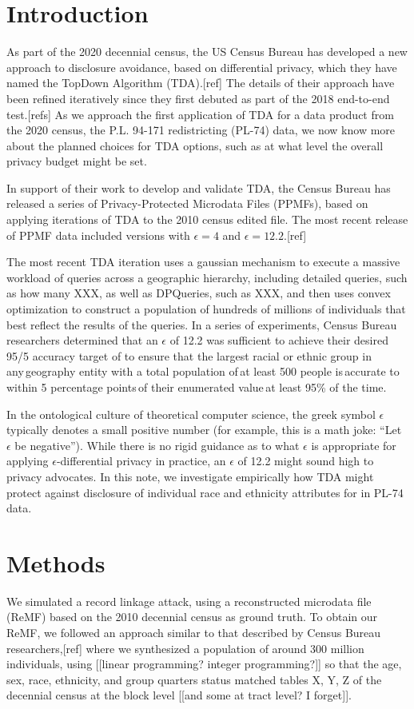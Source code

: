 \documentclass{article}
\begin{document}
\section{Introduction}
\label{introduction}
As part of the 2020 decennial census, the US Census Bureau has developed a new approach to disclosure avoidance, based on differential privacy, which they have named the TopDown Algorithm (TDA).[ref]  The details of their approach have been refined iteratively since they first debuted as part of the 2018 end-to-end test.[refs]  As we approach the first application of TDA for a data product from the 2020 census, the P.L. 94-171 redistricting (PL-74) data, we now know more about the planned choices for TDA options, such as at what level the overall privacy budget might be set.

In support of their work to develop and validate TDA,  the Census Bureau has released a series of Privacy-Protected Microdata Files (PPMFs), based on applying iterations of TDA to the 2010 census edited file.  The most recent release of PPMF data included versions with $\epsilon=4$ and $\epsilon=12.2$.[ref]

The most recent TDA iteration uses a gaussian mechanism to execute a massive workload of queries across a geographic hierarchy, including detailed queries, such as how many XXX, as well as DPQueries, such as XXX, and then uses convex optimization to construct a population of hundreds of millions of individuals that best reflect the results of the queries.  In a series of experiments, Census Bureau researchers determined that an $\epsilon$ of 12.2 was sufficient to achieve their desired 95/5 accuracy target of to ensure that the largest racial or ethnic group in any geography entity with a total population of at least 500 people is accurate to within 5 percentage points of their enumerated value at least 95\% of the time.

In the ontological culture of theoretical computer science, the greek symbol $\epsilon$ typically denotes a small positive number (for example, this is a math joke: ``Let $\epsilon$ be negative'').  While there is no rigid guidance as to what $\epsilon$ is appropriate for applying $\epsilon$-differential privacy in practice, an $\epsilon$ of 12.2 might sound high to privacy advocates. In this note, we investigate empirically how TDA might protect against disclosure of individual race and ethnicity attributes for in PL-74 data.

\section{Methods}
We simulated a record linkage attack, using a reconstructed microdata file (ReMF) based on the 2010 decennial census as ground truth. To obtain our ReMF, we followed an approach similar to that described by Census Bureau researchers,[ref] where we synthesized a population of around 300 million individuals, using [[linear programming?  integer programming?]] so that the age, sex, race, ethnicity, and group quarters status matched tables X, Y, Z of the decennial census at the block level [[and some at tract level? I forget]].
\end{document}
